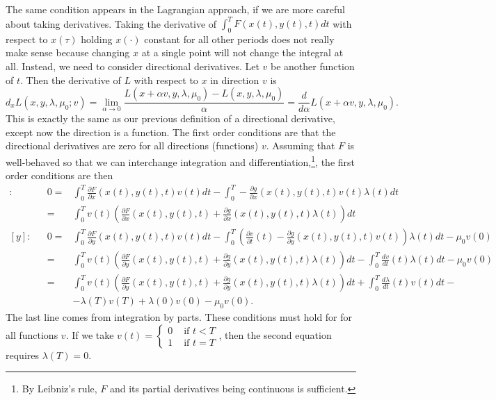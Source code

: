 The same condition appears in the Lagrangian approach, if we are more
careful about taking derivatives. Taking the derivative of $\int_0^T
F(x(t),y(t),t) dt$ with respect to $x(\tau)$ holding $x(\cdot)$
constant for all other periods does not really make sense because
changing $x$ at a single point will not change the integral at
all. Instead, we need to consider directional derivatives. Let $v$ be
another function of $t$. Then the derivative of $L$ with respect to
$x$ in direction $v$ is
\[ d_xL(x,y,\lambda,\mu_0;v) = \lim_{\alpha \to 0} \frac{L(x + \alpha
  v, y, \lambda, \mu_0) - L(x,y,\lambda,\mu_0)}{\alpha} =
\frac{d}{d\alpha} L(x+\alpha v, y, \lambda, \mu_0). \] This is exactly
the same as our previous definition of a directional derivative,
except now the direction is a function. The first order conditions are
that the directional derivatives are zero for all directions
(functions) $v$. Assuming that $F$ is well-behaved so that we can
interchange integration and differentiation,\footnote{By Leibniz's
  rule, $F$ and its partial derivatives being continuous is
  sufficient.}, the first order conditions are then 
\begin{align*}
  [x]:&& 0 = & \int_0^T \frac{\partial F}{\partial x}(x(t),y(t),t) v(t) dt -
  \int_0^T -\frac{\partial g}{\partial x}(x(t),y(t),t) v(t) \lambda(t)
  dt \\ 
  && = & \int_0^T v(t) \left(\frac{\partial F}{\partial x}(x(t),y(t),t) +
    \frac{\partial g}{\partial x}(x(t),y(t),t) \lambda(t)\right) dt \\
  [y]:&& 0 = & \int_0^T \frac{\partial F}{\partial
    y}(x(t),y(t),t) v(t) dt - 
  \int_0^T \left(\frac{\partial v}{\partial t}(t) -\frac{\partial
      g}{\partial y}(x(t),y(t),t) v(t)\right) \lambda(t)  dt  - \mu_0v(0)\\
  && = & \int_0^T v(t) \left(\frac{\partial F}{\partial
      y}(x(t),y(t),t) + \frac{\partial g}{\partial y}(x(t),y(t),t)
    \lambda(t)  \right)dt - \int_0^T \frac{dv}{dt}(t)\lambda(t)
         dt  - \mu_0v(0)\\
  && = & \int_0^T v(t) \left(\frac{\partial F}{\partial
      y}(x(t),y(t),t) + \frac{\partial g}{\partial y}(x(t),y(t),t)
    \lambda(t)  \right)dt + \int_0^T \frac{d\lambda}{dt}(t)v(t)dt -
  \\ 
  &&  & - \lambda(T)v(T) + \lambda(0)v(0)  - \mu_0v(0).
\end{align*}
The last line comes from integration by parts.  These conditions must
hold for for all functions $v$. If we take $v(t) = \begin{cases} 0 &
  \text{ if  }t<T\\
  1 & \text{ if } t=T \end{cases}$, then the second equation requires
$\lambda(T)=0$.


